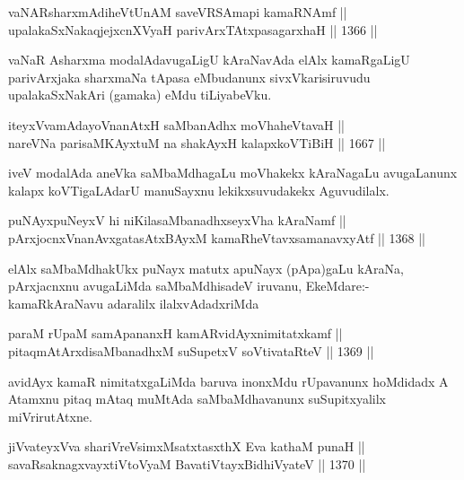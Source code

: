 \begin{shl}
vaNARsharxmAdiheVtUnAM saveVRSAmapi kamaRNAmf || \\
upalakaSxNakaqjejxcnXVyaH parivArxTAtxpasagarxhaH || 1366 ||  
\end{shl}

\begin{artha}
vaNaR Asharxma modalAdavugaLigU kAraNavAda elAlx kamaRgaLigU parivArxjaka sharxmaNa tApasa eMbudanunx sivxVkarisiruvudu upalakaSxNakAri (gamaka) eMdu tiLiyabeVku.
\end{artha}

\begin{shl}
iteyxVvamAdayoV\s nanAtxH saMbanAdhx moVhaheVtavaH || \\
nareVNa parisaMKAyxtuM na shakAyxH kalapxkoVTiBiH \hfill || 1667 ||  
\end{shl}

\begin{artha}
iveV modalAda aneVka saMbaMdhagaLu moVhakekx kAraNagaLu avugaLanunx kalapx koVTigaLAdarU manuSayxnu lekikxsuvudakekx Aguvudilalx.
\end{artha}

\begin{shl}
puNAyxpuNeyxV hi niKilasaMbanadhxseyxVha kAraNamf || \\
pArxjocnxV\s nanAvxgatasAtxBAyxM kamaRheVtavxsamanavxyAtf \hfill || 1368 ||  
\end{shl}

\begin{artha}
elAlx saMbaMdhakUkx puNayx matutx apuNayx (pApa)gaLu kAraNa, pArxjacnxnu avugaLiMda saMbaMdhisadeV iruvanu, EkeMdare:- kamaRkAraNavu adaralilx ilalxvAdadxriMda
\end{artha}

\begin{shl}
paraM rUpaM samApananxH kamARvidAyxnimitatxkamf || \\
pitaqmAtArxdisaMbanadhxM suSupetxV soV\s tivataRteV \hfill || 1369 ||  
\end{shl}

\begin{artha}
avidAyx kamaR nimitatxgaLiMda baruva inonxMdu rUpavanunx hoMdidadx A Atamxnu pitaq mAtaq muMtAda saMbaMdhavanunx suSupitxyalilx miVrirutAtxne.
\end{artha}


\begin{shl}
jiVvateyxVva shariVreV\s simxMsatxtasxthX Eva kathaM punaH ||  \\
savaRsaknagxvayxtiVtoV\s yaM BavatiVtayxBidhiVyateV \hfill || 1370 ||  
\end{shl}

